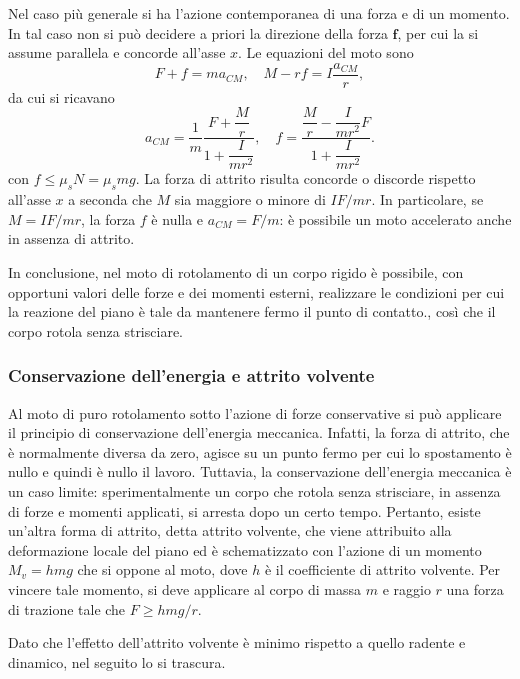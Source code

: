 Nel caso più generale si ha l'azione contemporanea di una forza e di un momento. In tal caso non si può decidere a priori la direzione della forza $\bm{f}$, per cui la si assume parallela e concorde all'asse $x$. Le equazioni del moto sono
\begin{equation}
    F+f=ma_{CM},\quad M-rf=I\frac{a_{CM}}{r},
\end{equation}
da cui si ricavano
\begin{equation}
    a_{CM}=\frac{1}{m}\frac{F+\dfrac{M}{r}}{1+\dfrac{I}{mr^2}},\quad f=\frac{\dfrac{M}{r}-\dfrac{I}{mr^2}F}{1+\dfrac{I}{mr^2}}.
\end{equation}
con $f\le\mu_sN=\mu_smg$. La forza di attrito risulta concorde o discorde rispetto all'asse $x$ a seconda che $M$ sia maggiore o minore di $IF/mr$. In particolare, se $M=IF/mr$, la forza $f$ è nulla e $a_{CM}=F/m$: è possibile un moto accelerato anche in assenza di attrito. 

In conclusione, nel moto di rotolamento di un corpo rigido è possibile, con opportuni valori delle forze e dei momenti esterni, realizzare le condizioni per cui la reazione del piano è tale da mantenere fermo il punto di contatto., così che il corpo rotola senza strisciare. 

\subsubsection{Conservazione dell'energia e attrito volvente}
Al moto di puro rotolamento sotto l'azione di forze conservative si può applicare il principio di conservazione dell'energia meccanica. Infatti, la forza di attrito, che è normalmente diversa da zero, agisce su un punto fermo per cui lo spostamento è nullo e quindi è nullo il lavoro. Tuttavia, la conservazione dell'energia meccanica è un caso limite: sperimentalmente un corpo che rotola senza strisciare, in assenza di forze e momenti applicati, si arresta dopo un certo tempo. Pertanto, esiste un'altra forma di attrito, detta attrito volvente, che viene attribuito alla deformazione locale del piano ed è schematizzato con l'azione di un momento $M_v=hmg$ che si oppone al moto, dove $h$ è il coefficiente di attrito volvente. Per vincere tale momento, si deve applicare al corpo di massa $m$ e raggio $r$ una forza di trazione tale che $F\ge hmg/r$.
\begin{obs}
    Dato che l'effetto dell'attrito volvente è minimo rispetto a quello radente e dinamico, nel seguito lo si trascura.
\end{obs}

